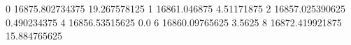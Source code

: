 0 16875.802734375 19.267578125
1 16861.046875 4.51171875
2 16857.025390625 0.490234375
4 16856.53515625 0.0
6 16860.09765625 3.5625
8 16872.419921875 15.884765625
